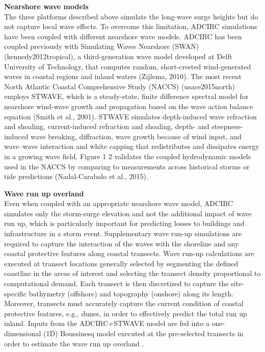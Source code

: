 \noindent\textbf{Nearshore wave models} \\The three platforms described above simulate the long-wave surge heights but do not capture local wave effects. To overcome this limitation, ADCIRC simulations have been coupled with different nearshore wave models. ADCIRC has been coupled previously with Simulating Waves Nearshore (SWAN) (kennedy2012tropical), a third-generation wave model developed at Delft University of Technology, that computes random, short-crested wind-generated waves in coastal regions and inland waters (Zijlema, 2010). The most recent North Atlantic Coastal Comprehensive Study (NACCS) (usace2015north) employs STWAVE, which is a steady-state, finite difference spectral model for nearshore wind-wave growth and propagation based on the wave action balance equation (Smith et al., 2001). STWAVE simulates depth-induced wave refraction and shoaling, current-induced refraction and shoaling, depth- and steepness-induced wave breaking, diffraction, wave growth because of wind input, and wave–wave interaction and white capping that redistributes and dissipates energy in a growing wave field. Figure 1 2 validates the coupled hydrodynamic models used in the NACCS by comparing to measurements across historical storms or tide predictions (Nadal-Carabalo et al., 2015). 
\newline

\noindent\textbf{Wave run up overland} \\Even when coupled with an appropriate nearshore wave model, ADCIRC simulates only the storm-surge elevation and not the additional impact of wave run up, which is particularly important for predicting losses to buildings and infrastructure in a storm event. Supplementary wave run-up simulations are required to capture the interaction of the waves with the shoreline and any coastal protective features along coastal transects. Wave run-up calculations are executed at transect locations generally selected by segmenting the defined coastline in the areas of interest and selecting the transect density proportional to computational demand. Each transect is then discretized to capture the site-specific bathymetry (offshore) and topography (onshore) along its length. Moreover, transects must accurately capture the current condition of coastal protective features, e.g., dunes, in order to effectively predict the total run up inland. Inputs from the ADCIRC+STWAVE model are fed into a one-dimensional (1D) Boussinesq model executed at the pre-selected transects in order to estimate the wave run up overland \citep{demirbilek_2009}. 
\newline

